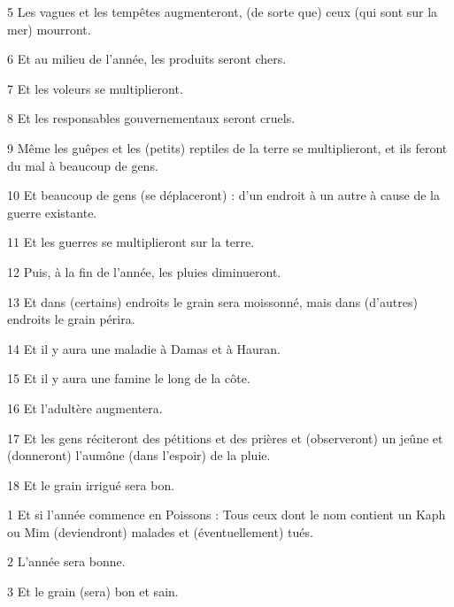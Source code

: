 \par 5 Les vagues et les tempêtes augmenteront, (de sorte que) ceux (qui sont sur la mer) mourront.

\par 6 Et au milieu de l'année, les produits seront chers.

\par 7 Et les voleurs se multiplieront.

\par 8 Et les responsables gouvernementaux seront cruels.

\par 9 Même les guêpes et les (petits) reptiles de la terre se multiplieront, et ils feront du mal à beaucoup de gens.

\par 10 Et beaucoup de gens (se déplaceront) : d'un endroit à un autre à cause de la guerre existante.

\par 11 Et les guerres se multiplieront sur la terre.

\par 12 Puis, à la fin de l'année, les pluies diminueront.

\par 13 Et dans (certains) endroits le grain sera moissonné, mais dans (d'autres) endroits le grain périra.

\par 14 Et il y aura une maladie à Damas et à Hauran.

\par 15 Et il y aura une famine le long de la côte.

\par 16 Et l'adultère augmentera.

\par 17 Et les gens réciteront des pétitions et des prières et (observeront) un jeûne et (donneront) l'aumône (dans l'espoir) de la pluie.

\par 18 Et le grain irrigué sera bon.


\par 1 Et si l'année commence en Poissons : Tous ceux dont le nom contient un Kaph ou Mim (deviendront) malades et (éventuellement) tués.

\par 2 L'année sera bonne.

\par 3 Et le grain (sera) bon et sain.

